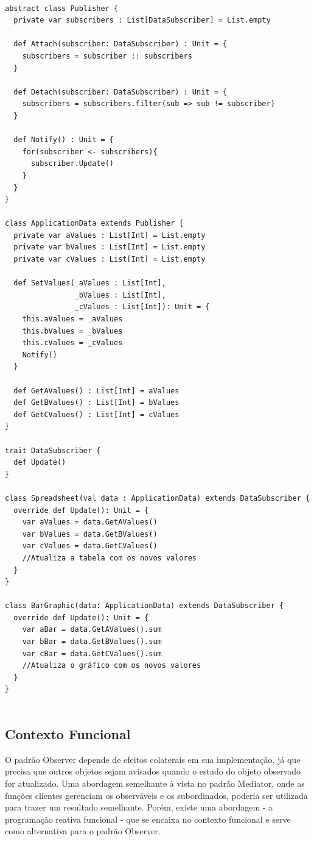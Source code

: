 \begin{lstlisting}[caption={Observer Orientação a Objetos},label=ooobserver]

abstract class Publisher {
  private var subscribers : List[DataSubscriber] = List.empty

  def Attach(subscriber: DataSubscriber) : Unit = {
    subscribers = subscriber :: subscribers
  }

  def Detach(subscriber: DataSubscriber) : Unit = {
    subscribers = subscribers.filter(sub => sub != subscriber)
  }

  def Notify() : Unit = {
    for(subscriber <- subscribers){
      subscriber.Update()
    }
  }
}

class ApplicationData extends Publisher {
  private var aValues : List[Int] = List.empty
  private var bValues : List[Int] = List.empty
  private var cValues : List[Int] = List.empty

  def SetValues(_aValues : List[Int],
                _bValues : List[Int],
                _cValues : List[Int]): Unit = {
    this.aValues = _aValues
    this.bValues = _bValues
    this.cValues = _cValues
    Notify()
  }

  def GetAValues() : List[Int] = aValues
  def GetBValues() : List[Int] = bValues
  def GetCValues() : List[Int] = cValues
}

trait DataSubscriber {
  def Update()
}

class Spreadsheet(val data : ApplicationData) extends DataSubscriber {
  override def Update(): Unit = {
    var aValues = data.GetAValues()
    var bValues = data.GetBValues()
    var cValues = data.GetCValues()
    //Atualiza a tabela com os novos valores
  }
}

class BarGraphic(data: ApplicationData) extends DataSubscriber {
  override def Update(): Unit = {
    var aBar = data.GetAValues().sum
    var bBar = data.GetBValues().sum
    var cBar = data.GetCValues().sum
    //Atualiza o gráfico com os novos valores
  }
}
    
\end{lstlisting}

\subsection*{Contexto Funcional}

O padrão Observer depende de 
efeitos colaterais em sua implementação, 
já que precisa que outros objetos sejam avisados 
quando o estado do objeto observado for 
atualizado. Uma abordagem semelhante à vista 
no padrão Mediator, onde as funções clientes 
gerenciam os observáveis e os subordinados, 
poderia ser utilizada para trazer um resultado 
semelhante. Porém, existe uma abordagem - a 
programação reativa funcional - que se encaixa 
no contexto funcional e serve como alternativa 
para o padrão Observer\cite{reactiveprog}.

